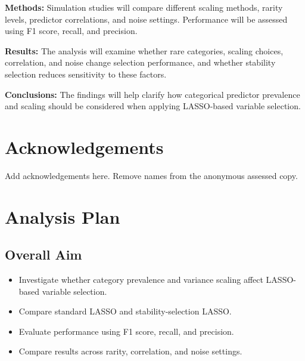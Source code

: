 \documentclass[12pt,a4paper,twoside]{report}
\begin{document}
\textbf{Methods:} Simulation studies will compare different scaling methods, rarity levels, predictor correlations, and noise settings. Performance will be assessed using F1 score, recall, and precision.

\textbf{Results:} The analysis will examine whether rare categories, scaling choices, correlation, and noise change selection performance, and whether stability selection reduces sensitivity to these factors.

\textbf{Conclusions:} The findings will help clarify how categorical predictor prevalence and scaling should be considered when applying LASSO-based variable selection.

\cleardoublepage

\chapter*{Acknowledgements}

Add acknowledgements here. Remove names from the anonymous assessed copy.

\cleardoublepage

\tableofcontents
\cleardoublepage
\listoftables
{}
\cleardoublepage
\listoffigures
{}
\cleardoublepage

\setcounter{page}{1}

\chapter{Analysis Plan}

\section{Overall Aim}

\begin{itemize}
  \item Investigate whether category prevalence and variance scaling affect LASSO-based variable selection.
  \item Compare standard LASSO and stability-selection LASSO.
  \item Evaluate performance using F1 score, recall, and precision.
  \item Compare results across rarity, correlation, and noise settings.
\end{itemize}
\end{document}
